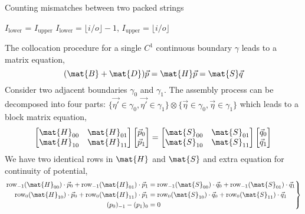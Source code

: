 \documentclass{jfm}
\begin{document}
\begin{algorithm}
  \caption{Counting mismatches between two packed strings
    \label{alg:packed-dna-hamming}}
  \begin{algorithmic}[1]
     \hfill{}
\State    $I_\mathrm{lower}$  =    $I_\mathrm{upper}$  
          \Else
\State              $I_\mathrm{lower} = \lfloor i/o\rfloor - 1$,\quad
              $I_\mathrm{upper} = \lfloor i/o\rfloor$  
          \EndIf
    
    \EndFor
    
    
    \EndFor
    \EndFunction
  \end{algorithmic}
\end{algorithm}
The collocation procedure for a single $C^1$ continuous boundary $\gamma$ leads
to a matrix equation,
\begin{equation}
(\mat{B}+\mat{D})\vec{p} =\mat{H}\vec{p} = \mat{S}\vec{q}
\end{equation}
Consider two adjacent boundaries $\gamma_0$ and $\gamma_1$.
The assembly process can be decomposed into
four parts: 
$\{\vec{\eta'}\in\gamma_0,\vec{\eta'}\in\gamma_1\}\otimes\{\vec{\eta}\in\gamma_0,\vec{\eta}\in\gamma_1\}$
which leads to a block matrix equation,
\begin{equation}
\begin{bmatrix}
\mat{H}_{00}&\mat{H}_{01}\\\mat{H}_{10}&\mat{H}_{11}
\end{bmatrix}
\begin{bmatrix}
\vec{p}_0\\\vec{p}_1
\end{bmatrix}
=\begin{bmatrix}
\mat{S}_{00}&\mat{S}_{01}\\\mat{S}_{10}&\mat{S}_{11}
\end{bmatrix}
\begin{bmatrix}
\vec{q}_0\\\vec{q}_1
\end{bmatrix}
\end{equation}
We have two identical rows in $\mat{H}$ and $\mat{S}$ 
and extra equation for continuity of potential,
\begin{equation}\left.\begin{aligned}
\mathrm{row}_{-1}(\mat{H}_{00})\cdot\vec{p}_0
+\mathrm{row}_{-1}(\mat{H}_{01})\cdot\vec{p}_1
&=\mathrm{row}_{-1}(\mat{S}_{00})\cdot\vec{q}_0
+\mathrm{row}_{-1}(\mat{S}_{01})\cdot\vec{q}_1\\
\mathrm{row}_{0}(\mat{H}_{10})\cdot\vec{p}_0
+\mathrm{row}_{0}(\mat{H}_{11})\cdot\vec{p}_1
&=\mathrm{row}_{0}(\mat{S}_{10})\cdot\vec{q}_0
+\mathrm{row}_{0}(\mat{S}_{11})\cdot\vec{q}_1\\
(p_0)_{-1}-(p_1)_{0}&=0
\end{aligned}\right\}\end{equation}
\end{document}
